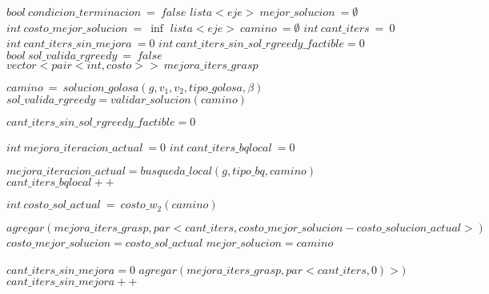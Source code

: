 \begin{algorithmic}[1]


	\Statex
	\State $bool \: condicion\_terminacion\: =\: false$
    \State $lista<eje> \:mejor\_solucion\: = \emptyset$
    \State $int \:costo\_mejor\_solucion\: =\: \inf$
    \State $lista<eje> \:camino\: = \emptyset$
    \State $int\: cant\_iters \:= \:0$
    \State $int\: cant\_iters\_sin\_mejora \:= 0$
    \State $int\: cant\_iters\_sin\_sol\_rgreedy\_factible = 0$
    \State $ bool\: sol\_valida\_rgreedy\: =\: false $
    \State $vector<pair<int, costo> > \: mejora\_iters\_grasp$
    \Statex 


    	\State $camino\: =\: solucion\_golosa(g, v_1,v_2, tipo\_golosa, \beta)$
    	\State $ sol\_valida\_rgreedy= validar\_solucion(camino)$

    	\Statex


    		\State $cant\_iters\_sin\_sol\_rgreedy\_factible = 0$

    		\State $int\: mejora\_iteracion\_actual\: = 0$
            \State $int\: cant\_iters\_bqlocal\: = 0$

            \Statex

    				\State $mejora\_iteracion\_actual=busqueda\_local(g, tipo\_bq, camino)$
    				\State $cant\_iters\_bqlocal++$

    		\EndWhile

    		\State $ int \:  costo\_sol\_actual \: = \: costo\_w_2(camino)$

    		\Statex


					\State $ agregar(mejora\_iters\_grasp, par<cant\_iters, costo\_mejor\_solucion - costo\_solucion\_actual>) $
				\EndIf
            	\State $costo\_mejor\_solucion = costo\_sol\_actual$
            	\State $mejor\_solucion = camino$
            
           	    \State $cant\_iters\_sin\_mejora = 0$
        	\Else
        			\State $ agregar(mejora\_iters\_grasp, par<cant\_iters, 0)>) $
                \EndIf
                \State $cant\_iters\_sin\_mejora++$
            

\end{algorithmic}
